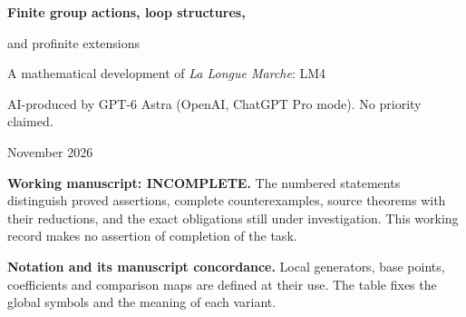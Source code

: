 \documentclass[11pt,a4paper]{article}
\begin{document}
\begin{center}
{\Large\bfseries Finite group actions, loop structures,\par
and profinite extensions\par}\smallskip
{\large A mathematical development of \emph{La Longue Marche}: LM4\par}\medskip
\end{center}
\noindent AI-produced by GPT-6 Astra (OpenAI, ChatGPT Pro mode). No priority claimed.
\par{} November 2026

\noindent\textbf{Working manuscript: INCOMPLETE.}
The numbered statements distinguish proved assertions, complete counterexamples,
source theorems with their reductions, and the exact obligations still under
investigation. This working record makes no assertion of completion of the task.

\smallskip
\noindent\textbf{Notation and its manuscript concordance.}
Local generators, base points, coefficients and comparison maps are defined at
their use. The table fixes the global symbols and the meaning of each variant.
\end{document}
